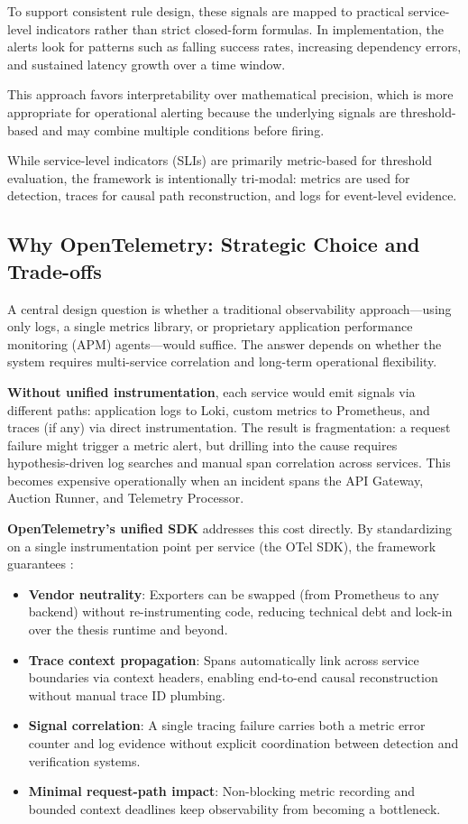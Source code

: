 To support consistent rule design, these signals are mapped to practical service-level indicators rather than strict closed-form formulas. In implementation, the alerts look for patterns such as falling success rates, increasing dependency errors, and sustained latency growth over a time window.

This approach favors interpretability over mathematical precision, which is more appropriate for operational alerting because the underlying signals are threshold-based and may combine multiple conditions before firing.

While service-level indicators (SLIs) are primarily metric-based for threshold evaluation, the framework is intentionally tri-modal: metrics are used for detection, traces for causal path reconstruction, and logs for event-level evidence.

\subsection{Why OpenTelemetry: Strategic Choice and Trade-offs}

A central design question is whether a traditional observability approach---using only logs, a single metrics library, or proprietary application performance monitoring (APM) agents---would suffice. The answer depends on whether the system requires multi-service correlation and long-term operational flexibility.

\textbf{Without unified instrumentation}, each service would emit signals via different paths: application logs to Loki, custom metrics to Prometheus, and traces (if any) via direct instrumentation. The result is fragmentation: a request failure might trigger a metric alert, but drilling into the cause requires hypothesis-driven log searches and manual span correlation across services. This becomes expensive operationally when an incident spans the API Gateway, Auction Runner, and Telemetry Processor.

\textbf{OpenTelemetry's unified SDK} addresses this cost directly. By standardizing on a single instrumentation point per service (the OTel SDK), the framework guarantees \citep{youngLearningOpenTelemetry2023,opentelemetryDocsOverview}:

\begin{itemize}
	\item \textbf{Vendor neutrality}: Exporters can be swapped (from Prometheus to any backend) without re-instrumenting code, reducing technical debt and lock-in over the thesis runtime and beyond.
	\item \textbf{Trace context propagation}: Spans automatically link across service boundaries via context headers, enabling end-to-end causal reconstruction without manual trace ID plumbing.
	\item \textbf{Signal correlation}: A single tracing failure carries both a metric error counter and log evidence without explicit coordination between detection and verification systems.
	\item \textbf{Minimal request-path impact}: Non-blocking metric recording and bounded context deadlines keep observability from becoming a bottleneck.
\end{itemize}

